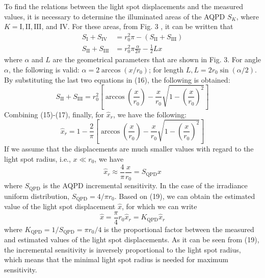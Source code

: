 \documentclass[10pt]{article}
\begin{document}
To find the relations between the light spot displacements and the measured values, it is necessary to determine the illuminated areas of the AQPD \(S_{K}\), where \(K=\mathrm{I}, \mathrm{II}, \mathrm{III}\), and IV. For these areas, from Fig. 3 , it can be written that
\[
\begin{aligned}
S_{\mathrm{I}}+S_{\mathrm{IV}} &=r_{0}^{2} \pi-\left(S_{\mathrm{II}}+S_{\mathrm{III}}\right) \\
S_{\mathrm{II}}+S_{\mathrm{III}} &=r_{0}^{2} \pi \frac{\alpha}{2 \pi}-\frac{1}{2} L x
\end{aligned}
\]
where \(\alpha\) and \(L\) are the geometrical parameters that are shown in Fig. 3. For angle \(\alpha\), the following is valid: \(\alpha=2 \arccos \left(x / r_{0}\right)\); for length \(L, L=2 r_{0} \sin (\alpha / 2) .\) By substituting the last two equations in (16), the following is obtained:
\[
S_{\mathrm{II}}+S_{\mathrm{III}}=r_{0}^{2}\left[\arccos \left(\frac{x}{r_{0}}\right)-\frac{x}{r_{0}} \sqrt{1-\left(\frac{x}{r_{0}}\right)^{2}}\right]
\]
Combining (15)-(17), finally, for \(\hat{x}_{r}\), we have the following:
\[
\hat{x}_{r}=1-\frac{2}{\pi}\left[\arccos \left(\frac{x}{r_{0}}\right)-\frac{x}{r_{0}} \sqrt{1-\left(\frac{x}{r_{0}}\right)^{2}}\right]
\]
If we assume that the displacements are much smaller values with regard to the light spot radius, i.e., \(x \ll r_{0}\), we have
\[
\hat{x}_{r} \approx \frac{4}{\pi} \frac{x}{r_{0}}=S_{\mathrm{QPD}} x
\]
where \(S_{\mathrm{QPD}}\) is the AQPD incremental sensitivity. In the case of the irradiance uniform distribution, \(S_{\mathrm{QPD}}=4 / \pi r_{0}\). Based on (19), we can obtain the estimated value of the light spot displacement \(\hat{x}\), for which we can write
\[
\hat{x}=\frac{\pi}{4} r_{0} \hat{x}_{r}=K_{\mathrm{QPD}} \hat{x}_{r}
\]
where \(K_{\mathrm{QPD}}=1 / S_{\mathrm{QPD}}=\pi r_{0} / 4\) is the proportional factor between the measured and estimated values of the light spot displacements. As it can be seen from (19), the incremental sensitivity is inversely proportional to the light spot radius, which means that the minimal light spot radius is needed for maximum sensitivity.
\end{document}
